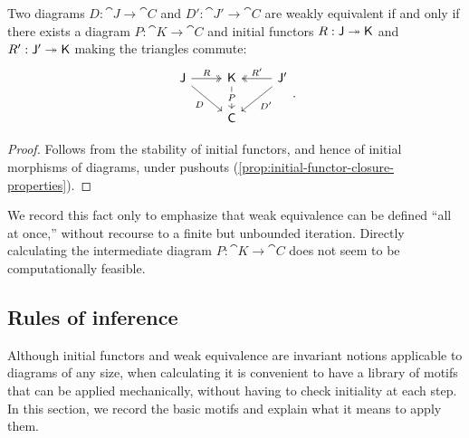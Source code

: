 \documentclass[11pt]{article}
\numberwithin{equation}{section}
\begin{document}
\begin{proposition}
  Two diagrams $D: \cat{J} \to \cat{C}$ and $D': \cat{J}' \to \cat{C}$ are weakly
  equivalent if and only if there exists a diagram $P: \cat{K} \to \cat{C}$ and
  initial functors $R: \mathsf{J} \twoheadrightarrow \mathsf{K}$ and
  $R': \mathsf{J}' \twoheadrightarrow \mathsf{K}$ making the triangles commute:
  \begin{equation*}
    \begin{tikzcd}
      {\cat{J}} & {\cat{K}} & {\cat{J}'} \\
      & {\cat{C}}
      \arrow["R", two heads, from=1-1, to=1-2]
      \arrow["D"', from=1-1, to=2-2]
      \arrow["P"{description}, from=1-2, to=2-2]
      \arrow["{R'}"', two heads, from=1-3, to=1-2]
      \arrow["{D'}", from=1-3, to=2-2]
    \end{tikzcd}.
  \end{equation*}
\end{proposition}
\begin{proof}
  Follows from the stability of initial functors, and hence of initial morphisms
  of diagrams, under pushouts (\cref{prop:initial-functor-closure-properties}).
\end{proof}

We record this fact only to emphasize that weak equivalence can be defined ``all
at once,'' without recourse to a finite but unbounded iteration. Directly
calculating the intermediate diagram $P: \cat{K} \to \cat{C}$ does not seem to
be computationally feasible.

\subsection{Rules of inference}
\label{sec:rules}

Although initial functors and weak equivalence are invariant notions applicable
to diagrams of any size, when calculating it is convenient to have a library of
motifs that can be applied mechanically, without having to check initiality at each
step. In this section, we record the basic motifs and explain what it means to
apply them.
\end{document}
